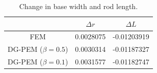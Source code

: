 \begin{table}[!ht]
  \begin{center}
    \begin{tabular}{| c || c | c |}
    \hline
                           & $\Delta r$ & $\Delta L$  \\ \hline \hline
    FEM                    & 0.0028075  & -0.01203919 \\ \hline
    DG-PEM ($\beta = 0.5$) & 0.0030314  & -0.01187327 \\ \hline
    DG-PEM ($\beta = 0.1$) & 0.0031577  & -0.01182747 \\
    \hline
    \end{tabular}
    \caption{Change in base width and rod length.}
    \vspace{-5pt}
    \label{tab:change_in_length_measurements}
    \vspace{-25pt}
  \end{center}
\end{table}